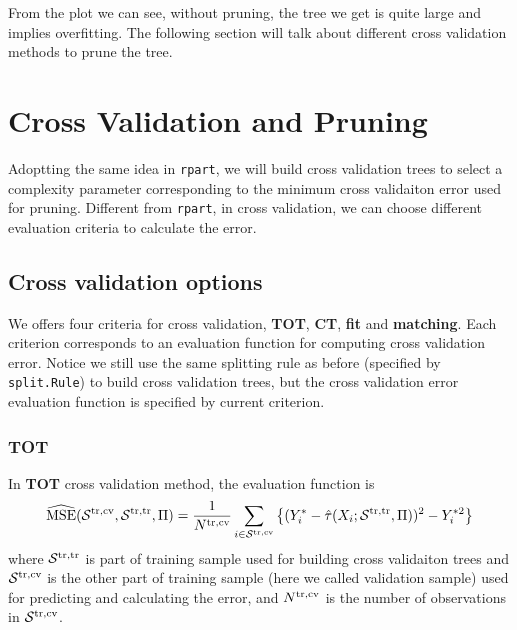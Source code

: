\documentclass[11pt]{article}
\newcommand{\calp}{{\Pi}}
\newcommand{\cals}{{\cal S}}
\newcommand{\mse}{{\rm MSE}}
\newcommand{\train}{{\rm tr}}
\newcommand{\tcv}{{\rm cv}}
\begin{document}
From the plot we can see, without pruning, the tree we get is quite large and implies overfitting. The following section will talk about different cross validation methods to prune the tree.

\section{Cross Validation and Pruning}
Adoptting the same idea in \texttt{rpart}, we will build cross validation trees to select a complexity parameter corresponding to the minimum cross validaiton error used for pruning. Different from \texttt{rpart}, in cross validation, we can choose different evaluation criteria to calculate the error.
\subsection{Cross validation options}
We offers four criteria for cross validation, \textbf{TOT}, \textbf{CT}, \textbf{fit} and \textbf{matching}. Each criterion corresponds to an evaluation function for computing cross validation error. Notice we still use the same splitting rule as before (specified by \texttt{split.Rule}) to build cross validation trees, but the cross validation error evaluation function is specified by current criterion.
\subsubsection{TOT}
In \textbf{TOT} cross validation method, the evaluation function is
\[\widehat{\mse}(\cals^{\train, \tcv}, \cals^{\train, \train}, \Pi) = \frac{1}{N^{\train, \tcv}}\sum_{i\in\cals^{\train, \tcv}}\left\{(Y^*_i - \hat{\tau}(X_i; \cals^{\train, \train}, \calp))^2  - Y^{*2}_i\right\}
\]
where $\cals^{\train, \train}$ is part of training sample used for building cross validaiton trees and $\cals^{\train, \tcv}$ is the other part of training sample (here we called validation sample) used for predicting and calculating the error, and $N^{\train, \tcv}$ is the number of observations in $\cals^{\train, \tcv}$.
\end{document}
